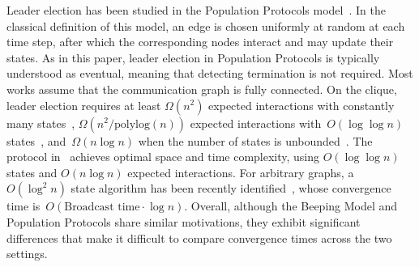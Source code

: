\documentclass{article}
\newcommand{\inote}[1]{{\color{blue} ({\bf Isa:} #1)}}
\begin{document}
Leader election has been studied in the Population Protocols model~\cite{AspnesR09}. In the classical definition of this model, an edge is chosen uniformly at random at each time step, after which the corresponding nodes interact and may update their states.
As in this paper, leader election in Population Protocols is typically understood as eventual, meaning that detecting termination is not required. Most works assume that the communication graph is fully connected.
On the clique, leader election requires at least $\Omega(n^2)$ expected interactions with constantly many states~\cite{DotyS18},
$\Omega(n^2/\mathrm{polylog}(n))$ expected interactions with~$O(\log \log n)$ states~\cite{AlistarhAEGR17}, and~$\Omega(n \log n)$ when the number of states is unbounded~\cite{SudoM20}. The protocol in~\cite{BerenbrinkGK20} achieves optimal space and time complexity, using $O(\log \log n)$ states and $O(n \log n)$ expected interactions.
For arbitrary graphs, a $O(\log^2 n)$ state algorithm has been recently identified~\cite{alistarh_nearoptimal_2022}, whose convergence time is~$O(\text{Broadcast time} \cdot \log n)$.
Overall, although the Beeping Model and Population Protocols share similar motivations, they exhibit significant differences that make it difficult to compare convergence times across the two settings.


\end{document}
